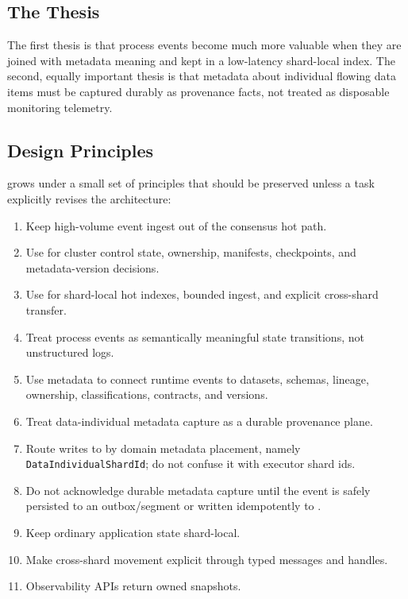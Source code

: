 \subsection{The Thesis}

The first thesis is that process events become much more valuable when they are
joined with metadata meaning and kept in a low-latency shard-local index. The
second, equally important thesis is that metadata about individual flowing data
items must be captured durably as provenance facts, not treated as disposable
monitoring telemetry.

\subsection{Design Principles}

\vannak{} grows under a small set of principles that should be preserved unless
a task explicitly revises the architecture:

\begin{enumerate}
\item Keep high-volume event ingest out of the consensus hot path.
\item Use \raft{} for cluster control state, ownership, manifests, checkpoints,
  and metadata-version decisions.
\item Use \sitas{} for shard-local hot indexes, bounded ingest, and explicit
  cross-shard transfer.
\item Treat \durga{} process events as semantically meaningful state
  transitions, not unstructured logs.
\item Use \ipto{} metadata to connect runtime events to datasets, schemas,
  lineage, ownership, classifications, contracts, and versions.
\item Treat data-individual metadata capture as a durable provenance plane.
\item Route writes to \ipto{} by domain metadata placement, namely
  \texttt{DataIndividualShardId}; do not confuse it with \sitas{} executor
  shard ids.
\item Do not acknowledge durable metadata capture until the event is safely
  persisted to an outbox/segment or written idempotently to \ipto{}.
\item Keep ordinary application state shard-local.
\item Make cross-shard movement explicit through typed messages and handles.
\item Observability APIs return owned snapshots.
\end{enumerate}

